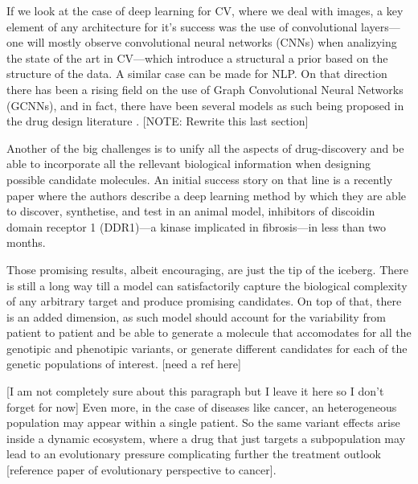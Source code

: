 \documentclass{article}
\begin{document}



 { \color{gray} If we look at the case of deep learning for CV, where we deal with
 images, a key element of any architecture for it's success was the use of convolutional
 layers---one will mostly observe convolutional neural networks (CNNs) when analizying
 the state of the art in CV---which introduce a structural a prior based on the
 structure of the data\cite{Guo2016}. A similar case can be made for
 NLP\cite{Young2018}. On that direction there has been a rising field on the use of
 Graph Convolutional Neural Networks (GCNNs)\cite{Wu2019}, and in fact, there have been
 several models as such being proposed in the drug design literature \cite{Sun2019}.
 [NOTE: Rewrite this last section]}


Another of the big challenges is to unify all the aspects of drug-discovery and be able
 to incorporate all the rellevant biological information when designing possible
 candidate molecules. An initial success story on that line is a recently paper
 \cite{Zhavoronkov2019} where the authors describe a deep learning method by which they
 are able to discover, synthetise, and test in an animal model, inhibitors of discoidin
 domain receptor 1 (DDR1)—a kinase implicated in fibrosis—in less than two months.

Those promising results, albeit encouraging, are just the tip of the iceberg. There is
still a long way till a model can satisfactorily capture the biological complexity of
any arbitrary target and produce promising candidates. On top of that, there is an added
dimension, as such model should account for the variability from patient to patient and
be able to generate a molecule that accomodates for all the genotipic and phenotipic
variants, or generate different candidates for each of the genetic populations of
interest. [need a ref here]

[I am not completely sure about this paragraph but I leave it here so I don't forget for
now] Even more, in the case of diseases like cancer, an heterogeneous population may
appear within a single patient. So the same variant effects arise inside a dynamic
ecosystem, where a drug that just targets a subpopulation may lead to an evolutionary
pressure complicating further the treatment outlook [reference paper of evolutionary
perspective to cancer].
\end{document}
